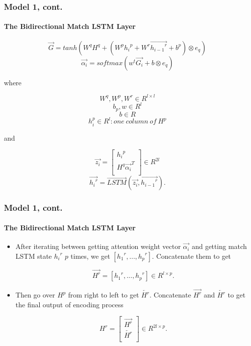 \documentclass{beamer}
\begin{document}
\begin{frame} \frametitle{Model 1, cont.}\framesubtitle{The Bidirectional Match LSTM Layer}

    $$\overrightarrow{G} = tanh(W^qH^q + (W^p{h_i}^p + W^r\overrightarrow{{h_{i-1}}^r} + b^p) \otimes e_q)$$
    $$\overrightarrow{\alpha _i} = softmax(w^t\overrightarrow{G_i} + b \otimes e_q)$$


    where

    $$W^q, W^p, W^r\in R^{l \times l} $$
    $$b_p, w\in R^{l}  $$
    $$b \in R $$
    $${h_{i}^p}\in R^{l}: one\ column\ of\ H^p  $$

    and

    \[ \overrightarrow{z_i} =
    \begin{bmatrix}
    {h_i}^p \\
    H^q\overrightarrow{ {\alpha _i}}^T \\
    \end{bmatrix}
    \in R^{2l}
    \]
    $$\overrightarrow{{h_i}^r} = \overrightarrow{LSTM}(\overrightarrow{z_i}, \overrightarrow{{h_{i-1}}^r}).$$

\end{frame}

\begin{frame} \frametitle{Model 1, cont.}\framesubtitle{The Bidirectional Match LSTM Layer}
    \begin{itemize}
        \item After iterating between getting attention weight vector $\overrightarrow{\alpha _i}$ and getting match LSTM state ${{h_{i}}^r}$ $p$ times, we get $[{{h_{1}}^r}, ..., {{h_{p}}^r}]$. Concatenate them to get

        $$\overrightarrow{H^r} = [{{h_{1}}^r}, ..., {{h_{p}}^r}] \in R^{l \times p}.$$

        \item Then go over $H^p$ from right to left to get $\overleftarrow{H^r}$. Concatenate $\overrightarrow{H^r}$ and $\overleftarrow{H^r}$ to get the final output of encoding process

        \[ H^r =
        \begin{bmatrix}
        \overrightarrow{H^r} \\
        \overleftarrow{H^r} \\
        \end{bmatrix}
        \in R^{2l \times p}.
        \]
    \end{itemize}

\end{frame}
\end{document}
